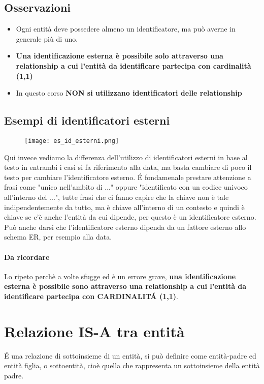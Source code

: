 \subsection*{Osservazioni}
\begin{itemize}
    \item Ogni entità deve possedere almeno un identificatore, ma può averne in generale più di uno.
    \item \textbf{Una identificazione esterna è possibile solo attraverso una relationship a
    cui l'entità da identificare partecipa con cardinalità (1,1)}
    \item In questo corso \textbf{NON si utilizzano identificatori delle relationship}
\end{itemize}
\subsection{Esempi di identificatori esterni}
\begin{figure}[h]
    \centering
    \texttt{[image: es\_id\_esterni.png]}
\end{figure}
Qui invece vediamo la differenza dell'utilizzo di identificatori esterni in base al testo
in entrambi i casi si fa riferimento alla data, ma basta cambiare di poco il testo per
cambiare l'identificatore esterno.
\'E fondamenale prestare attenzione a frasi come "unico nell'ambito di ..." oppure
"identificato con un codice univoco all'interno del ...", tutte frasi che ci fanno capire che
la chiave non è tale indipendentemente da tutto, ma è chiave all'interno di un contesto e quindi
è chiave se c'è anche l'entità da cui dipende, per questo è un identificatore esterno.
\\ Può anche darsi che l'identificatore esterno dipenda da un fattore esterno allo schema ER, 
per esempio alla data.
\paragraph*{Da ricordare} Lo ripeto perchè a volte sfugge ed è un errore grave, \textbf{una identificazione
esterna è possibile sono attraverso una relationship a cui l'entità da identificare partecipa con
CARDINALIT\'A (1,1)}.

\section{Relazione IS-A tra entità}
\'E una relazione di sottoinsieme di un entità, si può definire come entità-padre
ed entità figlia, o sottoentità, cioè quella che rappresenta un sottoinsieme della
entità padre.
